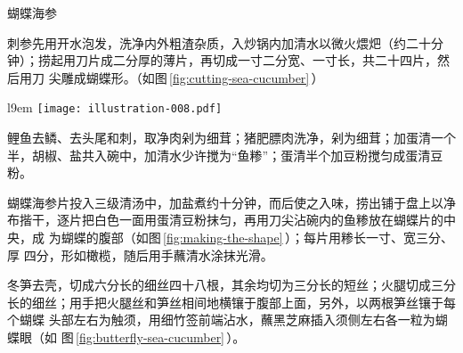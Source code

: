 \begin{recipe}{蝴蝶海参}

\ingredients


\preparation

\step 刺参先用开水泡发，洗净内外粗渣杂质，入炒锅内加清水以微火煨𤆵（约二十分
钟）；捞起用刀片成二分厚的薄片，再切成一寸二分宽、一寸长，共二十四片，然后用刀
尖雕成蝴蝶形。（如图\,\ref{fig:cutting-sea-cucumber}\,）

\begin{wrapfigure}[7]{l}{9em}%
\centering%
\vspace{-.6875\baselineskip}%
\texttt{[image: illustration-008.pdf]}%
\vspace{-.1875\baselineskip}%
\caption{用海参雕成的蝴蝶形}%
\label{fig:cutting-sea-cucumber}%
\end{wrapfigure}

\step 鲤鱼去鳞、去头尾和刺，取净肉剁为细茸；猪肥膘肉洗净，剁为细茸；加蛋清一个
半，胡椒、盐共入碗中，加清水少许搅为“鱼糁”；蛋清半个加豆粉搅匀成蛋清豆粉。

\step 蝴蝶海参片投入三级清汤中，加盐煮约十分钟，而后使之入味，捞出铺于盘上以净
布揩干，逐片把白色一面用蛋清豆粉抹匀，再用刀尖沾碗内的鱼糁放在蝴蝶片的中央，成
为蝴蝶的腹部（如图\,\ref{fig:making-the-shape}\,）；每片用糁长一寸、宽三分、厚
四分，形如橄榄，随后用手蘸清水涂抹光滑。

\step 冬笋去壳，切成六分长的细丝四十八根，其余均切为三分长的短丝；火腿切成三分
长的细丝；用手把火腿丝和笋丝相间地横镶于腹部上面，另外，以两根笋丝镶于每个蝴蝶
头部左右为触须，用细竹签前端沾水，蘸黑芝麻插入须侧左右各一粒为蝴蝶眼（如
图\,\ref{fig:butterfly-sea-cucumber}\,）。


\end{recipe}

